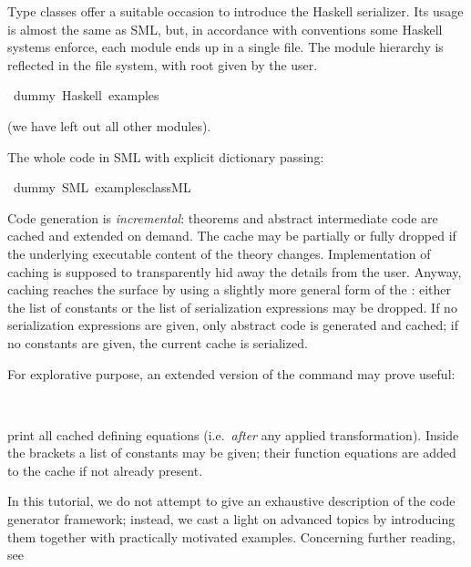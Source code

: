 \begin{isabellebody}
\begin{isamarkuptext}
Type classes offer a suitable occasion to introduce
  the Haskell serializer.  Its usage is almost the same
  as SML, but, in accordance with conventions
  some Haskell systems enforce, each module ends
  up in a single file. The module hierarchy is reflected in
  the file system, with root given by the user.%
\end{isamarkuptext}%
\isamarkuptrue%
\isamarkupfalse%
\ dummy\ {\isacharparenleft}Haskell\ {\isachardoublequoteopen}examples{\isacharslash}{\isachardoublequoteclose}{\isacharparenright}%
\begin{isamarkuptext}%

  (we have left out all other modules).

  The whole code in SML with explicit dictionary passing:%
\end{isamarkuptext}%
\isamarkuptrue%
\isamarkupfalse%
\ dummy\ {\isacharparenleft}SML\ {\isachardoublequoteopen}examples{\isacharslash}class{\isachardot}ML{\isachardoublequoteclose}{\isacharparenright}%
\begin{isamarkuptext}%
%
\end{isamarkuptext}%
\isamarkuptrue%
%
\isamarkuptrue%
%
\begin{isamarkuptext}%
Code generation is \emph{incremental}: theorems
  and abstract intermediate code are cached and extended on demand.
  The cache may be partially or fully dropped if the underlying
  executable content of the theory changes.
  Implementation of caching is supposed to transparently
  hid away the details from the user.  Anyway, caching
  reaches the surface by using a slightly more general form
  of the \isa{{\isasymCODEGEN}}: either the list of constants or the
  list of serialization expressions may be dropped.  If no
  serialization expressions are given, only abstract code
  is generated and cached; if no constants are given, the
  current cache is serialized.

  For explorative purpose, an extended version of the
  \isa{{\isasymCODEGEN}} command may prove useful:%
\end{isamarkuptext}%
\isamarkuptrue%
\isamarkupfalse%
\ {\isacharparenleft}{\isacharparenright}%
\begin{isamarkuptext}%
\noindent print all cached defining equations (i.e.~\emph{after}
  any applied transformation). Inside the brackets a
  list of constants may be given; their function
  equations are added to the cache if not already present.%
\end{isamarkuptext}%
\isamarkuptrue%
%
\isamarkuptrue%
%
\begin{isamarkuptext}%
In this tutorial, we do not attempt to give an exhaustive
  description of the code generator framework; instead,
  we cast a light on advanced topics by introducing
  them together with practically motivated examples.  Concerning
  further reading, see


\end{isamarkuptext}
\end{isabellebody}
